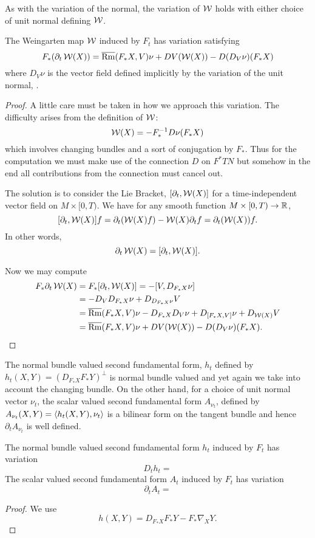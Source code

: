 As with the variation of the normal, the variation of \(\operatorname{\mathcal{W}}\) holds with either choice of unit normal defining \(\operatorname{\mathcal{W}}\).

\begin{lemma}
\label{lem:dt_W}
The Weingarten map \(\operatorname{\mathcal{W}}\) induced by \(F_t\) has variation satisfying
\[
F_{\ast} (\partial_t \operatorname{\mathcal{W}} (X)) = \overline{\operatorname{Rm}} (F_{\ast} X, V)\nu + DV (\operatorname{\mathcal{W}} (X)) - D(D_V \nu) ({F_{\ast} X})
\]
where \(D_V \nu\) is the vector field defined implicitly by the variation of the unit normal, .
\end{lemma}

\begin{proof}
A little care must be taken in how we approach this variation. The difficulty arises from the definition of \(\operatorname{\mathcal{W}}\):
\[
\operatorname{\mathcal{W}}(X) = -F_{\ast}^{-1} D\nu(F_{\ast} X)
\]
which involves changing bundles and a sort of conjugation by \(F_{\ast}\). Thus for the computation we must make use of the connection \(D\) on \(F^{\ast} TN\) but somehow in the end all contributions from the connection must cancel out.

The solution is to consider the Lie Bracket, \([\partial_t, \operatorname{\mathcal{W}}(X)]\) for a time-independent vector field on \(M \times [0, T)\). We have for any smooth function \(M \times [0, T) \to \mathbb{R}\),
\[
[\partial_t, \operatorname{\mathcal{W}}(X)] f = \partial_t (\operatorname{\mathcal{W}}(X) f) - \operatorname{\mathcal{W}}(X) \partial_t f = \partial_t (\operatorname{\mathcal{W}}(X)) f.
\]
In other words,
\[
\partial_t \operatorname{\mathcal{W}}(X) = [\partial_t, \operatorname{\mathcal{W}}(X)].
\]

Now we may compute
\[
\begin{split}
F_{\ast} \partial_t \operatorname{\mathcal{W}}(X) &= F_{\ast} [\partial_t, \operatorname{\mathcal{W}}(X)] = -[V, D_{F_{\ast} X} \nu] \\
&= -D_V D_{F_{\ast} X} \nu + D_{D_{F_{\ast} X} \nu} V \\
&= \overline{\operatorname{Rm}} (F_{\ast} X, V)\nu - D_{F_{\ast} X} D_V \nu + D_{[F_{\ast} X, V]} \nu + D_{\operatorname{\mathcal{W}}(X)} V \\
&= \overline{\operatorname{Rm}} (F_{\ast} X, V)\nu + DV (\operatorname{\mathcal{W}} (X)) - D(D_V \nu) ({F_{\ast} X}).
\end{split}
\]
\end{proof}

The normal bundle valued second fundamental form, \(h_t\) defined by \(h_t(X, Y) = (D_{F_{\ast} X} F_{\ast} Y)^{\perp}\) is normal bundle valued and yet again we take into account the changing bundle. On the other hand, for a choice of unit normal vector \(\nu_t\), the scalar valued second fundamental form \(A_{\nu_t}\), defined by \(A_{\nu_t} (X, Y) = \left\langle h_t(X, Y),\nu_t \right\rangle\) is a bilinear form on the tangent bundle and hence \(\partial_t A_{\nu_t}\) is well defined.

\begin{lemma}
The normal bundle valued second fundamental form \(h_t\) induced by \(F_t\) has variation
\[
D_t h_t =
\]
The scalar valued second fundamental form \(A_t\) induced by \(F_t\) has variation
\[
\partial_t A_t =
\]
\end{lemma}

\begin{proof}
We use
\[
h(X, Y) = D_{F_{\ast} X} F_{\ast} Y - F_{\ast} \nabla_X Y.
\]
\end{proof}
